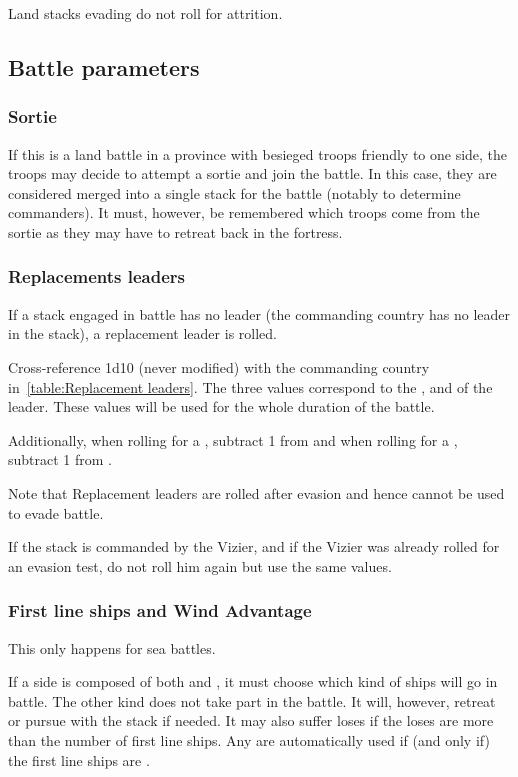 Land stacks evading do not roll for attrition.

\subsection{Battle parameters}
\label{chMilitary:Battle:Parameters}
\subsubsection{Sortie}
If this is a land battle in a province with besieged troops friendly to one
side, the troops may decide to attempt a sortie and join the battle. In this
case, they are considered merged into a single stack for the battle (notably
to determine commanders). It must, however, be remembered which troops come
from the sortie as they may have to retreat back in the fortress.

\subsubsection{Replacements leaders}
If a stack engaged in battle has no leader (the commanding country has no
leader in the stack), a replacement leader is rolled.


Cross-reference 1d10 (never modified) with the commanding country
in~\ref{table:Replacement leaders}. The three values correspond to the \Man,
\Fire and \Shock of the leader. These values will be used for the whole
duration of the battle.

Additionally, when rolling for a \POL \LeaderA, subtract 1 from \Man and when
rolling for a \PRU \LeaderA, subtract 1 from \Fire.

Note that Replacement leaders are rolled after evasion and hence cannot be
used to evade battle.

If the stack is commanded by the \TUR Vizier, and if the Vizier was already
rolled for an evasion test, do not roll him again but use the same values.

\subsubsection{First line ships and Wind Advantage}
This only happens for sea battles.

If a side is composed of both \NGD and \NWD, it must choose which kind of
ships will go in battle. The other kind does not take part in the battle. It
will, however, retreat or pursue with the stack if needed. It may also suffer
loses if the loses are more than the number of first line ships. Any \VGD are
automatically used if (and only if) the first line ships are \NGD.

